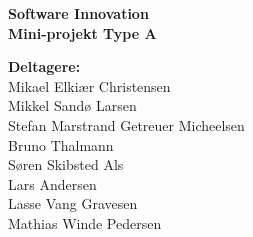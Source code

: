 \hspace*{-1cm}\parbox[b][\textheight][t]{\textwidth}
{

\vspace{1cm}
\begin{center}
\textbf{\Huge {Software Innovation}} \\ \vspace{0.5cm}
\textbf{\Large Mini-projekt Type A}\\ \vspace{0.5cm}
\end{center}



\vspace{0.25cm}
\begin{center}
\item {\textbf{Deltagere:}} \\
Mikael Elkiær Christensen\\
Mikkel Sandø Larsen\\
Stefan Marstrand Getreuer Micheelsen\\
Bruno Thalmann\\
Søren Skibsted Als\\
Lars Andersen\\
Lasse Vang Gravesen\\
Mathias Winde Pedersen

\end{center}

\thispagestyle{empty}

\newpage
\thispagestyle{empty}
\mbox{}
}